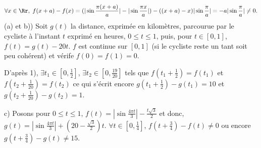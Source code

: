 {\begin{enumerate}
{$$\forall x\in\Rr,\;f(x+a)-f(x)=(|\sin\frac{\pi(x+a)}{a}|-|\sin\frac{\pi x}{a}|)-((x+a)-x)|\sin\frac{\pi}{a}|=-a|\sin\frac{\pi}{a}|\neq0.$$
(a) et b)) Soit $g(t)$ la distance, exprimée en kilomètres, parcourue par le cycliste à l'instant $t$ exprimé en heures, $0\leq t\leq1$, puis, pour $t\in[0,1]$, $f(t)=g(t)-20t$. $f$ est continue sur $[0,1]$ (si le cycliste reste un tant soit peu cohérent) et vérife $f(0)=f(1)=0$.

D'après 1), $\exists t_1\in[0,\frac{1}{2}]$, $\exists t_2\in[0,\frac{19}{20}]$ tels que $f(t_1+\frac{1}{2})=f(t_1)$ et $f(t_2+\frac{1}{20})=f(t_2)$ ce qui s'écrit encore
$g(t_1+\frac{1}{2})-g(t_1)=10$ et $g(t_2+\frac{1}{20})-g(t_2)=1$.

c) Posons pour $0\leq t\leq 1$, $f(t)=|\sin\frac{4\pi t}{3}|-\frac{t\sqrt{3}}{2}$ et donc, $g(t)=|\sin\frac{4\pi t}{3}|+(20-\frac{\sqrt{3}}{2})t$. $\forall t\in[0,\frac{1}{4}]$, $f(t+\frac{3}{4})-f(t)\neq 0$ ou encore $g(t+\frac{3}{4})-g(t)\neq 15$.
}
\end{enumerate}
}

